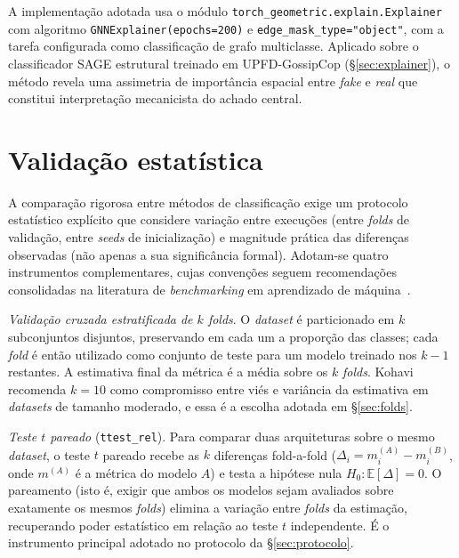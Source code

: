 A implementa\c{c}\~ao adotada usa o m\'odulo
\texttt{torch\_geometric.explain.Explainer} com algoritmo
\texttt{GNNExplainer(epochs=200)} e
\texttt{edge\_mask\_type="object"}, com a tarefa configurada como
classifica\c{c}\~ao de grafo multiclasse. Aplicado sobre o classificador
SAGE estrutural treinado em UPFD-GossipCop (\S\ref{sec:explainer}), o
m\'etodo revela uma assimetria de import\^ancia espacial entre
\emph{fake} e \emph{real} que constitui interpreta\c{c}\~ao mecanicista
do achado central.

\section{Valida\c{c}\~ao estat\'istica}
\label{sec:estatistica}

A compara\c{c}\~ao rigorosa entre m\'etodos de classifica\c{c}\~ao
exige um protocolo estat\'istico expl\'icito que considere
varia\c{c}\~ao entre execu\c{c}\~oes (entre \emph{folds} de
valida\c{c}\~ao, entre \emph{seeds} de inicializa\c{c}\~ao) e
magnitude pr\'atica das diferen\c{c}as observadas (n\~ao apenas a sua
signific\^ancia formal). Adotam-se quatro instrumentos complementares,
cujas conven\c{c}\~oes seguem recomenda\c{c}\~oes consolidadas na
literatura de \emph{benchmarking} em aprendizado de
m\'aquina~\cite{demsar2006statistical}.

\emph{Valida\c{c}\~ao cruzada estratificada de $k$ \emph{folds}}. O
\emph{dataset} \'e particionado em $k$ subconjuntos disjuntos,
preservando em cada um a propor\c{c}\~ao das classes; cada
\emph{fold} \'e ent\~ao utilizado como conjunto de teste para um
modelo treinado nos $k-1$ restantes. A estimativa final da m\'etrica
\'e a m\'edia sobre os $k$ \emph{folds}. Kohavi~\cite{kohavi1995cv}
recomenda $k = 10$ como compromisso entre vi\'es e vari\^ancia da
estimativa em \emph{datasets} de tamanho moderado, e essa \'e a
escolha adotada em \S\ref{sec:folds}.

\emph{Teste $t$ pareado} (\texttt{ttest\_rel}). Para comparar duas
arquiteturas sobre o mesmo \emph{dataset}, o teste $t$ pareado
recebe as $k$ diferen\c{c}as fold-a-fold ($\Delta_i = m_i^{(A)} -
m_i^{(B)}$, onde $m^{(A)}$ \'e a m\'etrica do modelo $A$) e testa a
hip\'otese nula $H_0: \mathbb{E}[\Delta] = 0$. O pareamento (isto
\'e, exigir que ambos os modelos sejam avaliados sobre exatamente os
mesmos \emph{folds}) elimina a varia\c{c}\~ao entre \emph{folds}
da estima\c{c}\~ao, recuperando poder estat\'istico em rela\c{c}\~ao ao
teste $t$ independente. \'E o instrumento principal adotado no
protocolo da \S\ref{sec:protocolo}.

